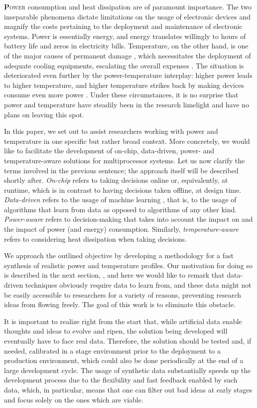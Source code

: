 \lettrine[findent=0.4em, nindent=0em]{\textbf{P}}{ower} consumption and heat
dissipation are of paramount importance. The two inseparable phenomena dictate
limitations on the usage of electronic devices and magnify the costs pertaining
to the deployment and maintenance of electronic systems. Power is essentially
energy, and energy translates willingly to hours of battery life and zeros in
electricity bills. Temperature, on the other hand, is one of the major causes of
permanent damage \cite{jedec}, which necessitates the deployment of adequate
cooling equipments, escalating the overall expenses \cite{chaudhry2015}. The
situation is deteriorated even further by the power-temperature interplay:
higher power leads to higher temperature, and higher temperature strikes back by
making devices consume even more power \cite{liu2007}. Under these
circumstances, it is no surprise that power and temperature have steadily been
in the research limelight and have no plans on leaving this spot.

In this paper, we set out to assist researchers working with power and
temperature in one specific but rather broad context. More concretely, we would
like to facilitate the development of on-chip, data-driven, power- and
temperature-aware solutions for multiprocessor systems. Let us now clarify the
terms involved in the previous sentence; the approach itself will be described
shortly after. \emph{On-chip} refers to taking decisions online or,
equivalently, at runtime, which is in contrast to having decisions taken
offline, at design time. \emph{Data-driven} refers to the usage of machine
learning \cite{bishop2006}, that is, to the usage of algorithms that learn from
data as opposed to algorithms of any other kind. \emph{Power-aware} refers to
decision-making that takes into account the impact on and the impact of power
(and energy) consumption. Similarly, \emph{temperature-aware} refers to
considering heat dissipation when taking decisions.

We approach the outlined objective by developing a methodology for a fast
synthesis of realistic power and temperature profiles. Our motivation for doing
so is described in the next section, , and here we would like
to remark that data-driven techniques obviously require data to learn from, and
these data might not be easily accessible to researchers for a variety of
reasons, preventing research ideas from flowing freely. The goal of this work is
to eliminate this obstacle.

It is important to realize right from the start that, while artificial data
enable thoughts and ideas to evolve and ripen, the solution being developed will
eventually have to face real data. Therefore, the solution should be tested and,
if needed, calibrated in a stage environment prior to the deployment to a
production environment, which could also be done periodically at the end of a
large development cycle. The usage of synthetic data substantially speeds up the
development process due to the flexibility and fast feedback enabled by such
data, which, in particular, means that one can filter out bad ideas at early
stages and focus solely on the ones which are viable.

